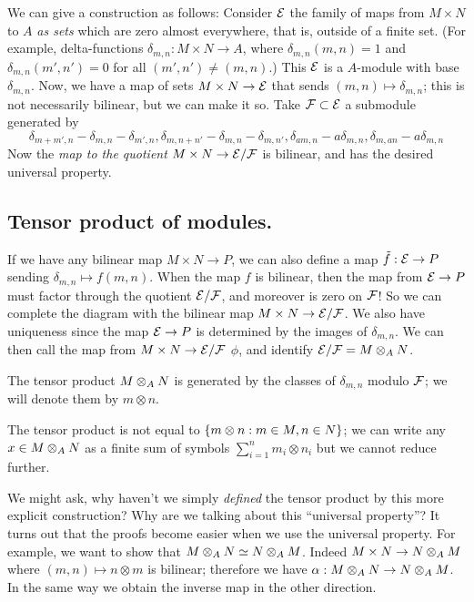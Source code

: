 We can give a construction as follows: Consider $\mathcal{E}$ the family of maps from $M \times N$ to $A$ \emph{as sets} which are zero almost everywhere, that is, outside of a finite set. (For example, delta-functions $\delta_{m,n}: M \times N \to A$, where $\delta_{m,n}(m, n) = 1$ and $\delta_{m,n}(m',n') = 0$ for all $(m', n') \neq (m, n)$.) This $\mathcal{E}$ is a  $A$-module with base $\delta_{m,n}$. Now, we have a map of sets $M \times N \to \mathcal{E}$ that sends $(m, n) \mapsto \delta_{m,n}$; this is not necessarily bilinear, but we can make it so. Take $\mathcal{F} \subset \mathcal{E}$ a submodule generated by \[\delta_{m + m', n} - \delta_{m, n} - \delta_{m', n}, \delta_{m, n + n'} - \delta_{m, n} - \delta_{m, n'}, \delta_{am, n} - a \delta_{m, n}, \delta_{m, an} - a\delta_{m, n}\] Now the \emph{map to the quotient} $M \times N \to \mathcal{E} / \mathcal{F}$ is bilinear, and has the desired universal property.

\subsection{Tensor product of modules.}
If we have any bilinear map $M \times N \to P$, we can also define a map $\tilde{f}: \mathcal{E} \to P$ sending $\delta_{m, n} \mapsto f(m, n)$. When the map $f$ is bilinear, then the map from $\mathcal{E} \to P$ must factor through the quotient $\mathcal{E} / \mathcal{F}$, and moreover is zero on $\mathcal{F}$! So we can complete the diagram with the bilinear map $M \times N \to \mathcal{E}/\mathcal{F}$. We also have uniqueness since the map $\mathcal{E} \to P$ is determined by the images of $\delta_{m, n}$. We can then call the map from $M \times N \to \mathcal{E}/\mathcal{F}$ $\phi$, and identify $\mathcal{E}/\mathcal{F} = M \otimes_{A} N$.

The tensor product $M \otimes_{A} N$ is generated by the classes of $\delta_{m, n}$ modulo $\mathcal{F}$; we will denote them by $m \otimes n$.

\begin{rmk}
The tensor product is not equal to $\left\{m \otimes n : m \in M, n \in N\right\}$; we can write any $x \in M \otimes_{A} N$ as a finite sum of symbols $\sum_{i = 1}^{n} m_i \otimes n_i$ but we cannot reduce further.
\end{rmk}

We might ask, why haven't we simply \emph{defined} the tensor product by this more explicit construction? Why are we talking about this ``universal property''? 
It turns out that the proofs become easier when we use the universal property.
For example, we want to show that $M \otimes_{A} N \simeq N \otimes_{A} M$.
Indeed $M \times N \to N \otimes_{A} M$ where $(m, n) \mapsto n \otimes m$ is bilinear; therefore we have $\alpha: M \otimes_{A} N \to N \otimes_{A} M$. In the same way we obtain the inverse map in the other direction.

